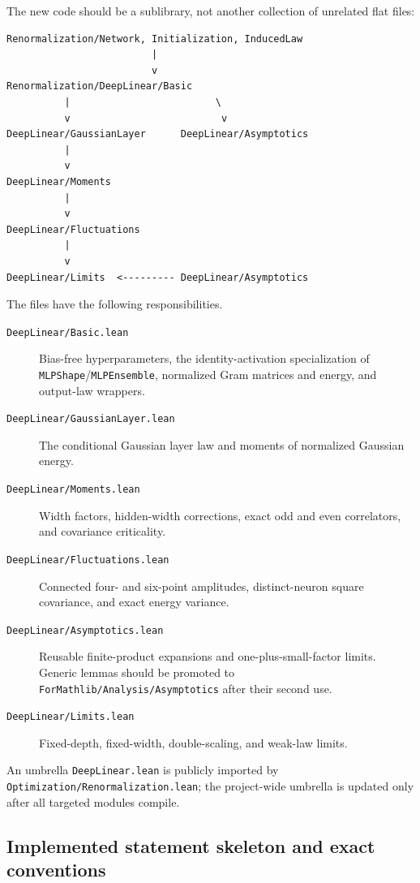 The new code should be a sublibrary, not another collection of unrelated flat files:
\begin{verbatim}
Renormalization/Network, Initialization, InducedLaw
                         |
                         v
Renormalization/DeepLinear/Basic
          |                         \
          v                          v
DeepLinear/GaussianLayer      DeepLinear/Asymptotics
          |
          v
DeepLinear/Moments
          |
          v
DeepLinear/Fluctuations
          |
          v
DeepLinear/Limits  <--------- DeepLinear/Asymptotics
\end{verbatim}
The files have the following responsibilities.
\begin{description}
  \item[\texttt{DeepLinear/Basic.lean}] Bias-free hyperparameters, the identity-activation
    specialization of \texttt{MLPShape}/\texttt{MLPEnsemble}, normalized Gram matrices and energy,
    and output-law wrappers.
  \item[\texttt{DeepLinear/GaussianLayer.lean}] The conditional Gaussian layer law and moments of
    normalized Gaussian energy.
  \item[\texttt{DeepLinear/Moments.lean}] Width factors, hidden-width corrections, exact odd and
    even correlators, and covariance criticality.
  \item[\texttt{DeepLinear/Fluctuations.lean}] Connected four- and six-point amplitudes,
    distinct-neuron square covariance, and exact energy variance.
  \item[\texttt{DeepLinear/Asymptotics.lean}] Reusable finite-product expansions and
    one-plus-small-factor limits.  Generic lemmas should be promoted to
    \texttt{ForMathlib/Analysis/Asymptotics} after their second use.
  \item[\texttt{DeepLinear/Limits.lean}] Fixed-depth, fixed-width, double-scaling, and weak-law
    limits.
\end{description}
An umbrella \texttt{DeepLinear.lean} is publicly imported by
\texttt{Optimization/Renormalization.lean}; the project-wide umbrella is updated only after all
targeted modules compile.

\subsection{Implemented statement skeleton and exact conventions}

